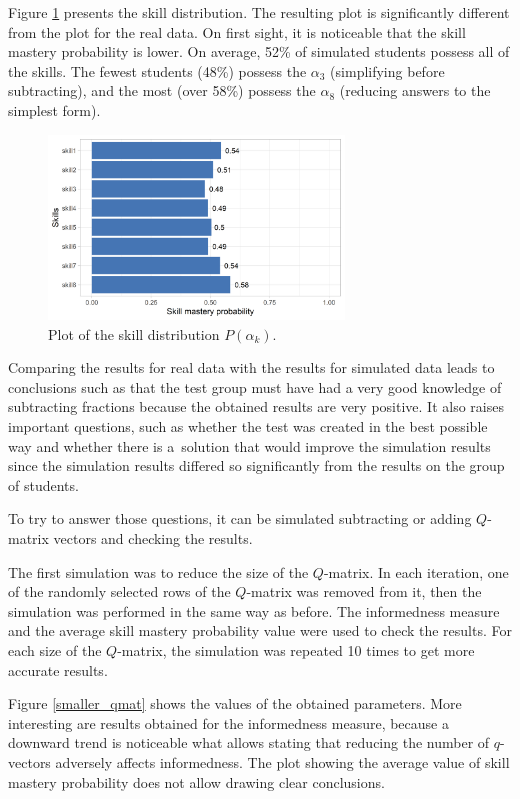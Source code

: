 \documentclass[english]{pwr_wmat_praca_dyplomowa}
\theoremstyle{plain}
\theoremstyle{definition}
\numberwithin{theorem}{chapter}
\begin{document}
Figure \ref{skill_possession_sim} presents the skill distribution. The resulting plot is significantly different from the plot for the real data. On first sight, it is noticeable that the skill mastery probability is lower. On average, 52\% of simulated students possess all of the skills. The fewest students (48\%) possess the $\alpha_3$ (simplifying before subtracting), and the most (over 58\%) possess the $\alpha_8$ (reducing answers to the simplest form). 

\begin{figure}[h!]
	\centering
	\includegraphics[width=0.7\textwidth]{Skill_mastery_probability_sim.png}
	\caption{Plot of the skill distribution $P(\alpha_k)$.}
	\label{skill_possession_sim}
\end{figure}

Comparing the results for real data with the results for simulated data leads to conclusions such as that the test group must have had a very good knowledge of subtracting fractions because the obtained results are very positive. It also raises important questions, such as whether the test was created in the best possible way and whether there is a~solution that would improve the simulation results since the simulation results differed so significantly from the results on the group of students.

To try to answer those questions, it can be simulated subtracting or adding $Q$-matrix vectors and checking the results.

The first simulation was to reduce the size of the $Q$-matrix. In each iteration, one of the randomly selected rows of the $Q$-matrix was removed from it, then the simulation was performed in the same way as before. The informedness measure and the average skill mastery probability value were used to check the results. For each size of the $Q$-matrix, the simulation was repeated 10 times to get more accurate results. 

Figure \ref{smaller_qmat} shows the values of the obtained parameters. More interesting are results obtained for the informedness measure, because a downward trend is noticeable what allows stating that reducing the number of $q$-vectors adversely affects informedness. The plot showing the average value of skill mastery probability does not allow drawing clear conclusions.
\end{document}
